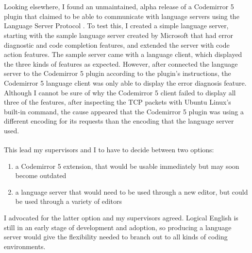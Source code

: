 \documentclass[../main.tex]{subfiles}
\begin{document}
\\
\\
Looking elsewhere, I found an unmaintained, alpha release of a Codemirror 5 plugin that claimed to be able to communicate with language servers using the Language Server Protocol \cite{lsp_editor_adapter}. To test this, I created a simple language server, starting with the sample language server created by Microsoft \cite{lsp_sample_server} that had error diagnostic and code completion features, and extended the server with code action features. The sample server came with a language client, which displayed the three kinds of features as expected. However, after connected the language server to the Codemirror 5 plugin according to the plugin's instructions, the Codemirror 5 language client was only able to display the error diagnosis feature. Although I cannot be sure of why the Codemirror 5 client failed to display all three of the features, after inspecting the TCP packets with Ubuntu Linux's built-in  command, the cause appeared that the Codemirror 5 plugin was using a different encoding for its requests than the encoding that the language server used.
\\
\\
This lead my supervisors and I to have to decide between two options:
\begin{enumerate}
    \item a Codemirror 5 extension, that would be usable immediately but may soon become outdated
    \item a language server that would need to be used through a new editor, but could be used through a variety of editors
\end{enumerate}
I advocated for the latter option and my supervisors agreed. Logical English is still in an early stage of development and adoption, so producing a language server would give the flexibility needed to branch out to all kinds of coding environments.
\end{document}
